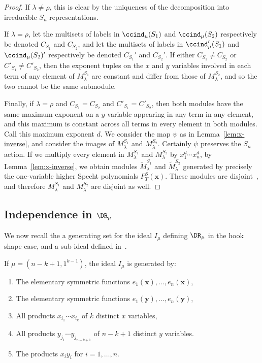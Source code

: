 \begin{proof}
	If $\lambda\neq \rho$, this is clear by the uniqueness of the decomposition into irreducible $S_n$ representations.
	
	If $\lambda=\rho$, let the multisets of labels in $\ccind_\mu(S_1)$ and $\ccind_\mu(S_2)$ respectively be denoted $C_{S_1}$ and $C_{S_2}$, and let the multisets of labels in $\ccind_\mu'(S_1)$ and $\ccind_\mu(S_2)'$ respectively be denoted $C_{S_1}'$ and $C_{S_2}'$.  If either $C_{S_1} \neq C_{S_2}$ or $C'_{S_1} \neq C'_{S_2}$, then the exponent tuples on the $x$ and $y$ variables involved in each term of any element of $M_\lambda^{S_1}$ are constant and differ from those of $M_\lambda^{S_2}$, and so the two cannot be the same submodule.
	
	Finally, if $\lambda=\rho$ and $C_{S_1}=C_{S_2}$ and $C'_{S_1}=C'_{S_2}$, then both modules have the same maximum exponent on a $y$ variable appearing in any term in any element, and this maximum is constant across all terms in every element in both modules.  Call this maximum exponent $d$.  We consider the map $\psi$ as in Lemma~\ref{lem:x-inverse}, and consider the images of $M_\lambda^{S_1}$ and $M_{\lambda}^{S_2}$.  Certainly $\psi$ preserves the $S_n$ action. If we multiply every element in $M_\lambda^{S_1}$ and $M_{\lambda}^{S_2}$ by $x_1^d\cdots x_n^d$, by Lemma~\ref{lem:x-inverse}, we obtain modules $\widetilde{M}_{\lambda}^{S_1}$ and $\widetilde{M}_{\lambda}^{S_2}$ generated by precisely the one-variable higher Specht polynomials $F_T^S(\mathbf{x})$.  These modules are disjoint~\cite{ATY}, and therefore $M_\lambda^{S_1}$ and $M_\lambda^{S_2}$ are disjoint as well.
\end{proof}

\subsection{Independence in \texorpdfstring{$\DR_\mu$}{}}

We now recall the a generating set for the ideal $I_\mu$ defining $\DR_\mu$ in the hook shape case, and a sub-ideal defined in~\cite{HookBases}.

\begin{prop} \label{prop:ideal}
	If $\mu=(n-k+1,1^{k-1})$, the ideal $I_\mu$ is generated by:
	\begin{enumerate}
		\item The elementary symmetric functions $e_1(\mathbf{x}),\ldots,e_n(\mathbf{x})$,
		\item The elementary symmetric functions 
		$e_1(\mathbf{y}),\ldots,e_n(\mathbf{y})$,
		\item All products $x_{i_1}\cdots x_{i_k}$ of $k$ distinct $x$ variables,
		\item All products $y_{j_1}\cdots y_{j_{n-k+1}}$ of $n-k+1$ distinct $y$ variables.
		\item The products $x_iy_i$ for $i=1,\ldots,n$.
	\end{enumerate}
\end{prop}

